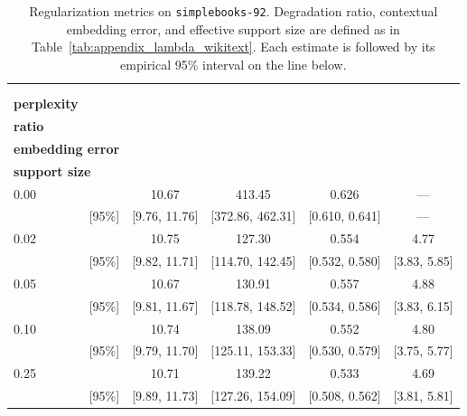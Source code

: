 \documentclass[11pt]{article}
\begin{document}
\begin{table}[H]
\centering
\caption{Regularization metrics on \texttt{simplebooks-92}. Degradation
ratio, contextual embedding error, and effective support size are defined as
in Table~\ref{tab:appendix_lambda_wikitext}. Each estimate is followed by its
empirical 95\% interval on the line below.}
\label{tab:appendix_lambda_simplebooks}
\small
\begin{tabular}{lcccc}
\toprule
\shortstack[c]{\textbf{$\lambda_m$}\\\mbox{}} & \shortstack[c]{\strut\textbf{Clean}\\\textbf{perplexity}\strut} & \shortstack[c]{\strut\textbf{Degradation}\\\textbf{ratio}\strut} & \shortstack[c]{\strut\textbf{Contextual}\\\textbf{embedding error}\strut} & \shortstack[c]{\strut\textbf{Effective}\\\textbf{support size}\strut} \\
\midrule
0.00 & 10.67 & 413.45 & 0.626 & --- \\
\multicolumn{1}{r}{\footnotesize [95\%]} & \footnotesize [9.76, 11.76] & \footnotesize [372.86, 462.31] & \footnotesize [0.610, 0.641] & \footnotesize --- \\
0.02 & 10.75 & 127.30 & 0.554 & 4.77 \\
\multicolumn{1}{r}{\footnotesize [95\%]} & \footnotesize [9.82, 11.71] & \footnotesize [114.70, 142.45] & \footnotesize [0.532, 0.580] & \footnotesize [3.83, 5.85] \\
0.05 & 10.67 & 130.91 & 0.557 & 4.88 \\
\multicolumn{1}{r}{\footnotesize [95\%]} & \footnotesize [9.81, 11.67] & \footnotesize [118.78, 148.52] & \footnotesize [0.534, 0.586] & \footnotesize [3.83, 6.15] \\
0.10 & 10.74 & 138.09 & 0.552 & 4.80 \\
\multicolumn{1}{r}{\footnotesize [95\%]} & \footnotesize [9.79, 11.70] & \footnotesize [125.11, 153.33] & \footnotesize [0.530, 0.579] & \footnotesize [3.75, 5.77] \\
0.25 & 10.71 & 139.22 & 0.533 & 4.69 \\
\multicolumn{1}{r}{\footnotesize [95\%]} & \footnotesize [9.89, 11.73] & \footnotesize [127.26, 154.09] & \footnotesize [0.508, 0.562] & \footnotesize [3.81, 5.81] \\
\bottomrule
\end{tabular}
\end{table}
\end{document}
